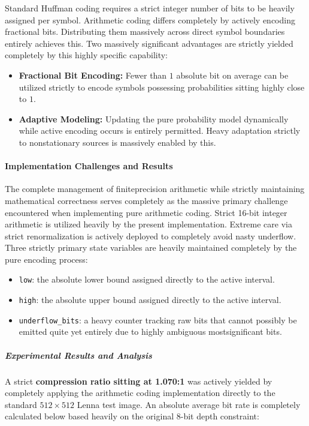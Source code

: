 \vspace{0.5em}
Standard Huffman coding requires a strict integer number of bits to be heavily assigned per symbol. Arithmetic coding differs completely by actively encoding fractional bits. Distributing them massively across direct symbol boundaries entirely achieves this. Two massively significant advantages are strictly yielded completely by this highly specific capability:
\begin{itemize}
    \item \textbf{Fractional Bit Encoding:} Fewer than $1$ absolute bit on average can be utilized strictly to encode symbols possessing probabilities sitting highly close to $1$.
    \item \textbf{Adaptive Modeling:} Updating the pure probability model dynamically while active encoding occurs is entirely permitted. Heavy adaptation strictly to nonstationary sources is massively enabled by this.
\end{itemize}

\paragraph{Implementation Challenges and Results}

The complete management of finiteprecision arithmetic while strictly maintaining mathematical correctness serves completely as the massive primary challenge encountered when implementing pure arithmetic coding. Strict 16-bit integer arithmetic is utilized heavily by the present implementation. Extreme care via strict renormalization is actively deployed to completely avoid nasty underflow. Three strictly primary state variables are heavily maintained completely by the pure encoding process:
\begin{itemize}
    \item \texttt{low}: the absolute lower bound assigned directly to the active interval.
    \item \texttt{high}: the absolute upper bound assigned directly to the active interval.
    \item \texttt{underflow\_bits}: a heavy counter tracking raw bits that cannot possibly be emitted quite yet entirely due to highly ambiguous mostsignificant bits.
\end{itemize}

\subparagraph{Experimental Results and Analysis}

A strict \textbf{compression ratio sitting at 1.070:1} was actively yielded by completely applying the arithmetic coding implementation directly to the standard $512 \times 512$ Lenna test image. An absolute average bit rate is completely calculated below based heavily on the original 8-bit depth constraint:

